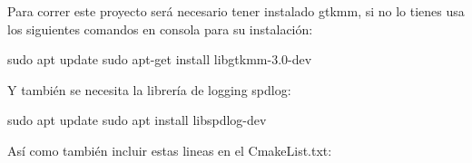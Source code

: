Para correr este proyecto será necesario tener instalado gtkmm, si no lo tienes usa los siguientes comandos en consola para su instalación\+: \begin{DoxyVerb}sudo apt update
sudo apt-get install libgtkmm-3.0-dev
\end{DoxyVerb}


Y también se necesita la librería de logging spdlog\+: \begin{DoxyVerb}sudo apt update
sudo apt install libspdlog-dev
\end{DoxyVerb}


Así como también incluir estas lineas en el Cmake\+List.\+txt\+: 
 